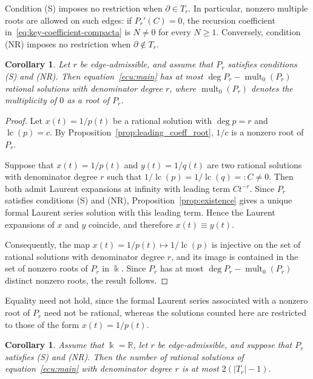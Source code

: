 \documentclass[12pt,a4paper]{amsart}
\numberwithin{theorem}{section}
\newtheorem{corollary}[theorem]{Corollary}
\theoremstyle{definition}
\begin{document}
	Condition {\rm (S)} imposes no restriction when $\partial\in T_r$. In particular, nonzero multiple roots are allowed on such edges: if $P_r'(C)=0$, the recursion coefficient in~\eqref{eq:key-coefficient-compacta} is $N\neq0$ for every $N\geq1$. Conversely, condition {\rm (NR)} imposes no restriction when $\partial\notin T_r$.
	
	\begin{corollary}\label{cor:main_bound}
		Let $r$ be edge-admissible, and assume that $P_r$ satisfies conditions {\rm (S)} and {\rm (NR)}. Then equation~\eqref{ecu:main} has at most $\deg P_r-\operatorname{mult}_0(P_r)$ rational solutions with denominator degree $r$, where $\operatorname{mult}_0(P_r)$ denotes the multiplicity of $0$ as a root of $P_r$.
	\end{corollary}
	
	\begin{proof}
		Let $x(t)=1/p(t)$ be a rational solution with $\deg p=r$ and $\operatorname{lc}(p)=c$. By Proposition~\ref{prop:leading_coeff_root}, $1/c$ is a nonzero root of $P_r$.
		
		Suppose that $x(t)=1/p(t)$ and $y(t)=1/q(t)$ are two rational solutions with denominator degree $r$ such that $1/\operatorname{lc}(p)=1/\operatorname{lc}(q)=:C\neq0$. Then both admit Laurent expansions at infinity with leading term $Ct^{-r}$. Since $P_r$ satisfies conditions {\rm (S)} and {\rm (NR)}, Proposition~\ref{prop:existence} gives a unique formal Laurent series solution with this leading term. Hence the Laurent expansions of $x$ and $y$ coincide, and therefore $x(t)\equiv y(t)$.
		
		Consequently, the map $x(t)=1/p(t)\mapsto1/\operatorname{lc}(p)$ is injective on the set of rational solutions with denominator degree $r$, and its image is contained in the set of nonzero roots of $P_r$ in $\Bbbk$. Since $P_r$ has at most $\deg P_r-\operatorname{mult}_0(P_r)$ distinct nonzero roots, the result follows.
	\end{proof}
	
	Equality need not hold, since the formal Laurent series associated with a nonzero root of $P_r$ need not be rational, whereas the solutions counted here are restricted to those of the form $x(t)=1/p(t)$.
	
	\begin{corollary}\label{cor:descartes}
		Assume that $\Bbbk=\mathbb{R}$, let $r$ be edge-admissible, and suppose that $P_r$ satisfies {\rm (S)} and {\rm (NR)}. Then the number of rational solutions of equation~\eqref{ecu:main} with denominator degree $r$ is at most $2(|T_r|-1)$.
	\end{corollary}
	
\end{document}
